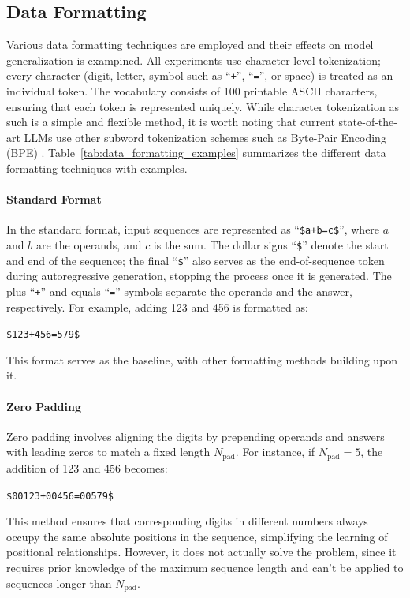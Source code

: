 \subsection{Data Formatting}\label{subsec:data_formatting}
Various data formatting techniques are employed and their effects on model generalization is exampined. All experiments use character-level tokenization; every character (digit, letter, symbol such as ``\texttt{+}'', ``\texttt{=}'', or space) is treated as an individual token. The vocabulary consists of 100 printable ASCII characters, ensuring that each token is represented uniquely. While character tokenization as such is a simple and flexible method, it is worth noting that current state-of-the-art LLMs use other subword tokenization schemes such as Byte-Pair Encoding (BPE) \parencite{sennrich_neural_2016,brown_language_2020}. Table~\ref{tab:data_formatting_examples} summarizes the different data formatting techniques with examples.

\paragraph{Standard Format}
In the standard format, input sequences are represented as ``\verb|$a+b=c$|'', where $a$ and $b$ are the operands, and $c$ is the sum. The dollar signs ``\verb|$|'' denote the start and end of the sequence; the final ``\verb|$|'' also serves as the end-of-sequence token during autoregressive generation, stopping the process once it is generated. The plus ``\verb|+|'' and equals ``\verb|=|'' symbols separate the operands and the answer, respectively. For example, adding 123 and 456 is formatted as:
\begin{center}
    \verb|$123+456=579$|
\end{center}
This format serves as the baseline, with other formatting methods building upon it.

\paragraph{Zero Padding}
Zero padding involves aligning the digits by prepending operands and answers with leading zeros to match a fixed length $N_\text{pad}$. For instance, if $N_\text{pad}=5$, the addition of 123 and 456 becomes:
\begin{center}
    \verb|$00123+00456=00579$|
\end{center}
This method ensures that corresponding digits in different numbers always occupy the same absolute positions in the sequence, simplifying the learning of positional relationships. However, it does not actually solve the problem, since it requires prior knowledge of the maximum sequence length and can't be applied to sequences longer than $N_\text{pad}$.

